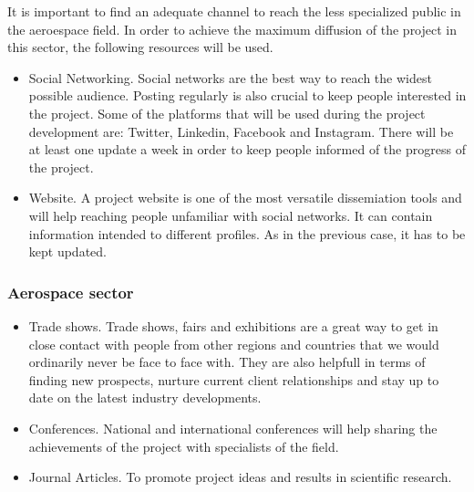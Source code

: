 It is important to find an adequate channel to reach the less specialized public in the aeroespace field. In order to achieve the maximum diffusion of the project in this sector,  the following resources will be used.

\begin{itemize}
\item{ 
	Social Networking. Social networks are the best way to reach the widest possible audience. Posting regularly is also crucial to keep people interested in the project. Some of the platforms that will be used during the project development are: Twitter, Linkedin, Facebook and Instagram. There will be at least one update a week in order to keep people informed of the progress of the project.
}
\item {
	Website. A project website is one of the most versatile dissemiation tools and will help reaching people unfamiliar with social networks. It can contain information intended to different profiles. As in the previous case, it has to be kept updated.
}
\end{itemize}

\subsubsection{Aerospace sector}


\begin{itemize}

\item{
	Trade shows. Trade shows, fairs and exhibitions are a great way to get in close contact with people from other regions and countries that we would ordinarily never be face to face with. They are also helpfull in terms of finding new prospects, nurture current client relationships and stay up to date on the latest industry developments. 
}
\item {
	Conferences. National and international conferences will help sharing the achievements of the project with specialists of the field.
}
\item {
	Journal Articles. To promote project ideas and results in scientific research.
}
\end{itemize}